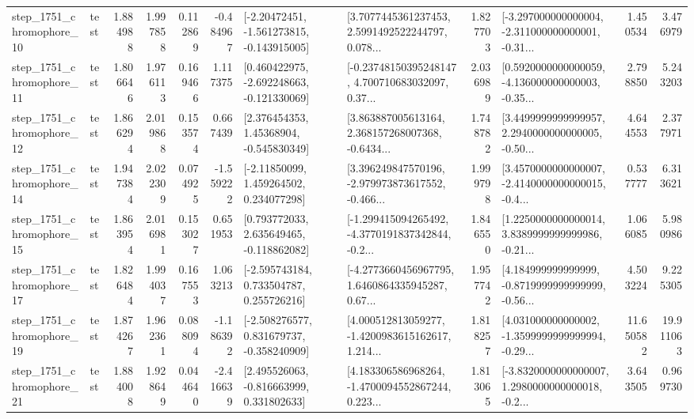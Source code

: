 \begin{tabular}{llrrrrllrlrr}
 step\_1751\_chromophore\_10 &      test &      1.884988 &    1.997858 &      0.112869 & -0.484967 &   [-2.20472451, -1.561273815, -0.143915005] &  [3.7077445361237453, 2.5991492522244797, 0.078... &       1.827703 &  [-3.297000000000004, -2.311000000000001, -0.31... &            1.450534 &          3.476979 \\
 step\_1751\_chromophore\_11 &      test &      1.806646 &    1.976113 &      0.169466 &  1.117375 &   [0.460422975, -2.692248663, -0.121330069] &  [-0.23748150395248147, 4.700710683032097, 0.37... &       2.036989 &  [0.5920000000000059, -4.136000000000003, -0.35... &            2.798850 &          5.243203 \\
 step\_1751\_chromophore\_12 &      test &      1.866294 &    2.019868 &      0.153574 &  0.667439 &     [2.376454353, 1.45368904, -0.545830349] &  [3.863887005613164, 2.368157268007368, -0.6434... &       1.748782 &  [3.4499999999999957, 2.2940000000000005, -0.50... &            4.644553 &          2.377971 \\
 step\_1751\_chromophore\_14 &      test &      1.947384 &    2.022309 &      0.074925 & -1.559222 &     [-2.11850099, 1.459264502, 0.234077298] &  [3.396249847570196, -2.979973873617552, -0.466... &       1.999798 &  [3.4570000000000007, -2.4140000000000015, -0.4... &            0.537777 &          6.313621 \\
 step\_1751\_chromophore\_15 &      test &      1.863954 &    2.016981 &      0.153027 &  0.651953 &    [0.793772033, 2.635649465, -0.118862082] &  [-1.299415094265492, -4.3770191837342844, -0.2... &       1.846550 &  [1.2250000000000014, 3.8389999999999986, -0.21... &            1.066085 &          5.980986 \\
 step\_1751\_chromophore\_17 &      test &      1.826484 &    1.994037 &      0.167553 &  1.063213 &    [-2.595743184, 0.733504787, 0.255726216] &  [-4.2773660456967795, 1.6460864335945287, 0.67... &       1.957742 &  [4.184999999999999, -0.8719999999999999, -0.56... &            4.503224 &          9.225305 \\
 step\_1751\_chromophore\_19 &      test &      1.874267 &    1.962361 &      0.088094 & -1.186392 &   [-2.508276577, 0.831679737, -0.358240909] &  [4.000512813059277, -1.4200983615162617, 1.214... &       1.818257 &  [4.031000000000002, -1.3599999999999994, -0.29... &           11.650582 &         19.911063 \\
 step\_1751\_chromophore\_21 &      test &      1.884008 &    1.928649 &      0.044640 & -2.416639 &    [2.495526063, -0.816663999, 0.331802633] &  [4.183306586968264, -1.4700094552867244, 0.223... &       1.813065 &  [-3.8320000000000007, 1.2980000000000018, -0.2... &            3.643505 &          0.969730 \\

\end{tabular}
